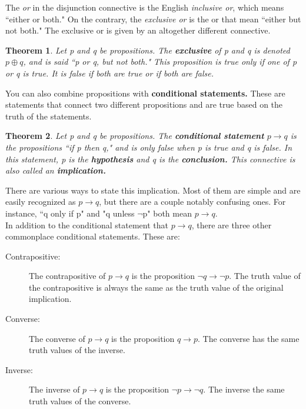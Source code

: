 \documentclass[12pt,letterpaper]{article}
\newtheorem{theorem}{Theorem}
\begin{document}
The \textit{or} in the disjunction connective is the English \textit{inclusive or}, which means ``either or both." On the contrary, the \textit{exclusive or} is the or that mean ``either but not both." The exclusive or is given by an altogether different connective. 

\begin{theorem}
	Let p and q be propositions. The \textbf{exclusive} of p and q is denoted $p \oplus q$, and is said ``p or q, but not both." This proposition is true only if one of p or q is true. It is false if both are true or if both are false.
\end{theorem}

You can also combine propositions with \textbf{conditional statements.} These are statements that connect two different propositions and are true based on the truth of the statements.

\begin{theorem}
	Let p and q be propositions. The \textbf{conditional statement} $p \rightarrow q$  is the propositions ``if p then q," and is only false when p is true and q is false. In this statement, p is the \textbf{hypothesis} and q is the \textbf{conclusion.} This connective is also called an \textbf{implication.}
\end{theorem}

There are various ways to state this implication. Most of them are simple and are easily recognized as $p \rightarrow q$, but there are a couple notably confusing ones. For instance, ``q only if p" and "q unless $\lnot$p" both mean $p\rightarrow q$. \\

In addition to the conditional statement that $p \rightarrow q$, there are three other commonplace conditional statements. These are:

\begin{description}
	\item[Contrapositive:] The contrapositive of $p \rightarrow q$ is the proposition $\lnot q \rightarrow \lnot p$. The truth value of the contrapositive is always the same as the truth value of the original implication.
	\item[Converse:] The converse of $p \rightarrow q$ is the proposition $q \rightarrow p$. The converse has the same truth values of the inverse.
	\item[Inverse:] The inverse of $p \rightarrow q$ is the proposition $\lnot p \rightarrow \lnot q$. The inverse the same truth values of the converse.
\end{description}
\end{document}
